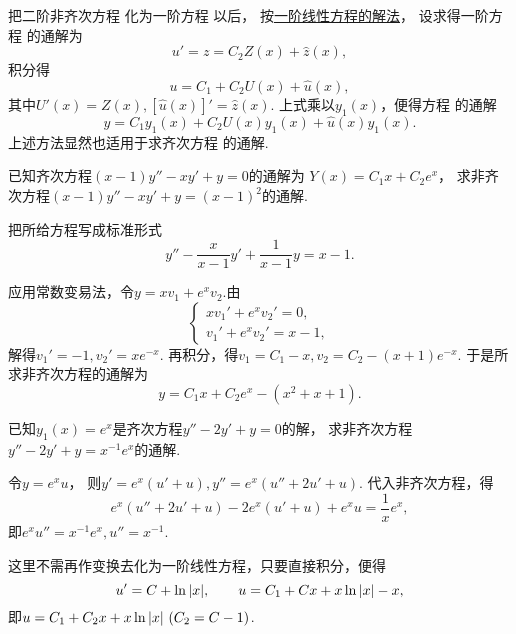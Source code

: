 \begin{enumerate}
	把二阶非齐次方程 
	化为一阶方程  以后，
	按\hyperref[section:微分方程.一阶线性微分方程]{一阶线性方程的解法}，
	设求得一阶方程  的通解为\[
		u' = z = C_2 Z(x) + \hat{z}(x),
	\]
	积分得\[
		u = C_1 + C_2 U(x) + \hat{u}(x),
	\]
	其中\(U'(x) = Z(x), [\hat{u}(x)]' = \hat{z}(x)\).
	上式乘以\(y_1(x)\)，便得方程  的通解
	\begin{equation}\label{equation:微分方程.二阶非齐次线性微分方程的通解.形式2}
		y = C_1 y_1(x) + C_2 U(x) y_1(x) + \hat{u}(x) y_1(x).
	\end{equation}
	上述方法显然也适用于求齐次方程  的通解.
\end{enumerate}

\begin{example}
已知齐次方程\((x-1)y'' - xy' + y = 0\)的通解为
\(Y(x) = C_1 x + C_2 e^x\)，
求非齐次方程\((x-1)y'' - xy' + y = (x-1)^2\)的通解.
\begin{solution}
把所给方程写成标准形式\[
	y'' - \frac{x}{x-1} y' + \frac{1}{x-1} y = x-1.
\]

应用常数变易法，令\(y = x v_1 + e^x v_2\).由\[
	\left\{ \begin{array}{l}
		x v_1' + e^x v_2' = 0, \\
		v_1' + e^x v_2' = x-1,
	\end{array} \right.
\]
解得\(v_1' = -1, v_2' = x e^{-x}\).
再积分，得\(v_1 = C_1 - x, v_2 = C_2 - (x+1) e^{-x}\).
于是所求非齐次方程的通解为\[
	y = C_1 x + C_2 e^x - (x^2+x+1).
\]
\end{solution}
\end{example}

\begin{example}
已知\(y_1(x) = e^x\)是齐次方程\(y'' - 2y' + y = 0\)的解，
求非齐次方程\(y'' - 2y' + y = x^{-1} e^x\)的通解.
\begin{solution}
令\(y = e^x u\)，
则\(y' = e^x (u'+u), y'' = e^x (u''+2u'+u)\).
代入非齐次方程，得\[
	e^x (u''+2u'+u) - 2e^x (u'+u) + e^x u = \frac{1}{x} e^x,
\]
即\(e^x u'' = x^{-1} e^x, u'' = x^{-1}\).

这里不需再作变换去化为一阶线性方程，只要直接积分，便得\[
	u' = C + \ln\abs{x},
	\qquad
	u = C_1 + C x + x\ln\abs{x} - x,
\]
即\(u = C_1 + C_2 x + x \ln\abs{x}\ (C_2=C-1)\).
\end{solution}
\end{example}

